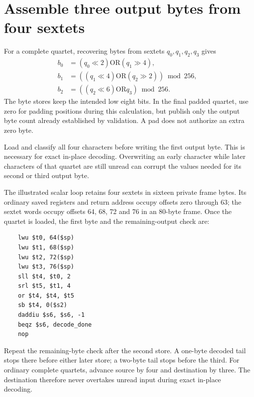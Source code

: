 \section{Assemble three output bytes from four sextets}
For a complete quartet, recovering bytes from sextets \(q_0,q_1,q_2,q_3\) gives
\[
  \begin{aligned}
    b_0 & =(q_0\ll2)\mathbin{\mathrm{OR}}(q_1\gg4),           \\
    b_1 & =((q_1\ll4)\mathbin{\mathrm{OR}}(q_2\gg2))\bmod256, \\
    b_2 & =((q_2\ll6)\mathbin{\mathrm{OR}}q_3)\bmod256.
  \end{aligned}
\]
The byte stores keep the intended low eight bits. In the final padded quartet, use
zero for padding positions during this calculation, but publish only the output byte
count already established by validation. A pad does not authorize an extra zero byte.

Load and classify all four characters before writing the first output byte. This is
necessary for exact in-place decoding. Overwriting an early character while later
characters of that quartet are still unread can corrupt the values needed for its
second or third output byte.

The illustrated scalar loop retains four sextets in sixteen private frame bytes.
Its ordinary saved registers and return address occupy offsets zero through 63; the
sextet words occupy offsets 64, 68, 72 and 76 in an 80-byte frame. Once the quartet is
loaded, the first byte and the remaining-output check are:

\begin{verbatim}
    lwu $t0, 64($sp)
    lwu $t1, 68($sp)
    lwu $t2, 72($sp)
    lwu $t3, 76($sp)
    sll $t4, $t0, 2
    srl $t5, $t1, 4
    or $t4, $t4, $t5
    sb $t4, 0($s2)
    daddiu $s6, $s6, -1
    beqz $s6, decode_done
    nop
\end{verbatim}

Repeat the remaining-byte check after the second store. A one-byte decoded tail stops
there before either later store; a two-byte tail stops before the third. For ordinary
complete quartets, advance source by four and destination by three. The destination
therefore never overtakes unread input during exact in-place decoding.
